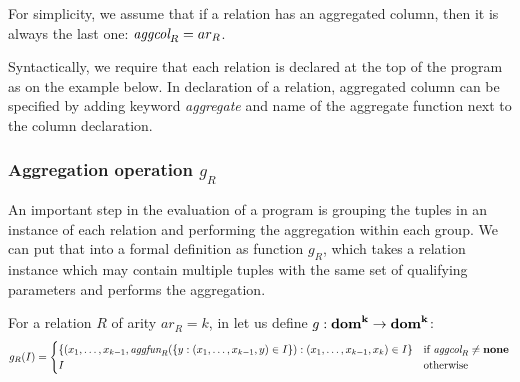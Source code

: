 For simplicity, we assume that if a relation has an aggregated column, then it is always the last one: $\textit{aggcol}_R = ar_R$.

Syntactically, we require that each relation is declared at the top of the program as on the example below. In declaration of a relation, aggregated column can be specified by adding keyword \textit{aggregate} and name of the aggregate function next to the column declaration.

\begin{figure}[h!]
\end{figure}

\subsubsection{Aggregation operation $g_R$}
An important step in the evaluation of a \datalogra program is grouping the tuples in an instance of each relation and performing the aggregation within each group. We can put that into a formal definition as function $g_R$, which takes a relation instance which may contain multiple tuples with the same set of qualifying parameters and performs the aggregation.
\begin{defn}\label{d:aggregationoperationgr}
For a relation $R$ of arity $ar_R = k$, in let us define $g: \bf{dom}^k \to \bf{dom}^k$:
$$
g_R(I) = \begin{cases}
\{(x_1, \dots, x_{k-1}, \textit{aggfun}_R(\{y: (x_1, \dots, x_{k-1}, y) \in I\}): (x_1, \dots, x_{k-1}, x_k) \in I\} & \text{if } \textit{aggcol}_R \ne \bf{none} \\
I & \text{otherwise}
\end{cases}
$$
\end{defn}

